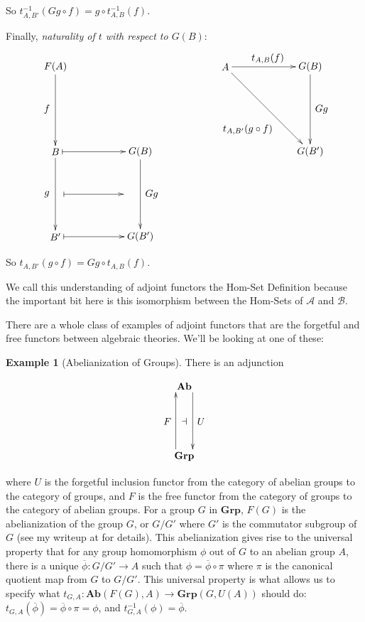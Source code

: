 \documentclass[11pt]{article}
\theoremstyle{definition}
\theoremstyle{definition}
\newtheorem*{ex}{Example}
\theoremstyle{plain}
\theoremstyle{plain}
\theoremstyle{plain}
\begin{document}
So $t^{-1}_{A,B'}(Gg \circ f) = g \circ t^{-1}_{A,B}(f)$.

Finally, \emph{naturality of $t$ with respect to $G(B)$}:

\begin{equation*}
\begin{xy}
(0, 0)*+{F(A)}="fa"; (0, -30)*+{B}="b"; (30, -30)*+{G(B)}="gb"; (0, -60)*+{B'}="bp"; (30, -60)*+{G(B')}="gbp";
(60, 0)*+{A}="at"; (90, 0)*+{G(B)}="gbt"; (90, -30)*+{G(B')}="gbpt";
{\ar "fa";"b"}?*!/^3mm/{f}; {\ar "gb";"gbp"}?*!/_4mm/{Gg}; {\ar "b";"bp"}?*!/^3mm/{g};
{\ar@{|->} "b";"gb"}; {\ar@{|->} "bp";"gbp"}; {\ar@{|->} (3, -45);(24, -45)};
{\ar "at";"gbt"}?*!/_3mm/{t_{A,B}(f)};
{\ar "gbt";"gbpt"}?*!/_4mm/{Gg};
{\ar "at";"gbpt"}?*!/^10mm/{t_{A,B'}(g \circ f)};
\end{xy}
\end{equation*}

So $t_{A,B'}(g \circ f) = Gg \circ t_{A,B}(f)$.

We call this understanding of adjoint functors the Hom-Set Definition because the important bit here is this isomorphism between the Hom-Sets of $\mathscr{A}$ and $\mathscr{B}$.

There are a whole class of examples of adjoint functors that are the forgetful and free functors between algebraic theories. We'll be looking at one of these:

 \begin{ex}[Abelianization of Groups]
 There is an adjunction

 \begin{equation*}
 \begin{xy}
 (0,0)*+{\textbf{Ab}}="ab"; (0,-25)*+{\textbf{Grp}}="grp";
 {\ar@<2.ex> "ab";"grp"}?*!/_3mm/{U}?*!/^3mm/{\dashv};
 {\ar@<2.ex> "grp";"ab"}?*!/_3mm/{F};
 \end{xy}
 \end{equation*}
 \end{ex}

 where $U$ is the forgetful inclusion functor from the category of abelian groups to the category of groups, and $F$ is the free functor from the category of groups to the category of abelian groups. For a group $G$ in $\textbf{Grp}$, $F(G)$ is the abelianization of the group $G$, or $G/G'$ where $G'$ is the commutator subgroup of $G$ (see my writeup at \cite{liu_abelianization_2018} for details). This abelianization gives rise to the universal property that for any group homomorphism $\phi$ out of $G$ to an abelian group $A$, there is a unique $\overline{\phi}: G/G' \to A$ such that $\phi = \overline{\phi} \circ \pi$ where $\pi$ is the canonical quotient map from $G$ to $G/G'$. This universal property is what allows us to specify what $t_{G,A}: \textbf{Ab}(F(G), A) \to \textbf{Grp}(G, U(A))$ should do: $t_{G,A}(\overline{\phi}) = \overline{\phi} \circ \pi = \phi$, and $t^{-1}_{G,A}(\phi) = \overline{\phi}$.
\end{document}
